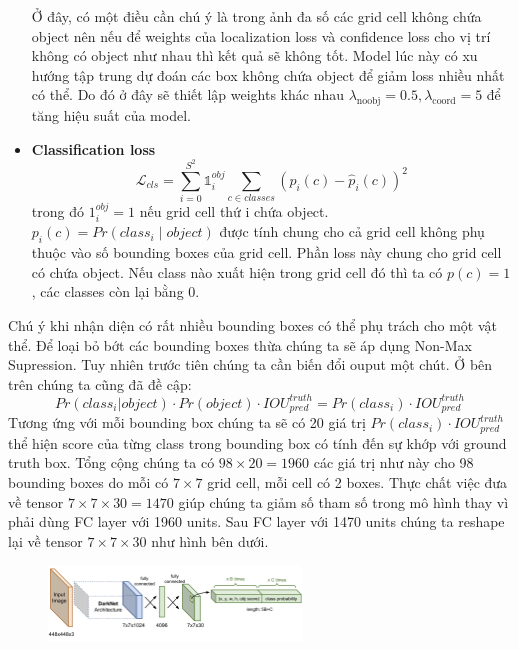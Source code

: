\begin{itemize}
Ở đây, có một điều cần chú ý là trong ảnh đa số các grid cell không chứa object nên nếu để weights của localization loss và confidence loss cho vị trí không có object như nhau thì kết quả sẽ không tốt. Model lúc này có xu hướng tập trung dự đoán các box không chứa object để giảm loss nhiều nhất có thể. Do đó ở đây sẽ thiết lập weights khác nhau $\lambda_\text{noobj} =0.5, \lambda_\text{coord} = 5$ để tăng hiệu suất của model.
    \item \textbf{Classification loss}
\begin{equation*}
    \mathcal{L}_{cls}={\sum_{i=0}^{S^2} \mathds{1}_i^{obj}  \sum_{c \in classes} (p_i(c) - \hat{p}_i(c))^2}
\end{equation*}
trong đó $1^{obj}_{i}=1$ nếu grid cell thứ i chứa object.\\

$p_i(c)=Pr(class_i \mid object)$ được tính chung cho cả grid cell không phụ thuộc vào số bounding boxes của grid cell. Phần loss này chung cho grid cell có chứa object. Nếu class nào xuất hiện trong grid cell đó thì ta có $p(c) = 1$, các classes còn lại bằng 0.
\end{itemize}

Chú ý khi nhận diện có rất nhiều bounding boxes có thể phụ trách cho một vật thể. Để loại bỏ bớt các bounding boxes thừa chúng ta sẽ áp dụng Non-Max Supression. Tuy nhiên trước tiên chúng ta cần biến đổi ouput một chút. Ở bên trên chúng ta cũng đã đề cập:
\[
Pr(class_i | object) \cdot Pr(object) \cdot IOU_{pred}^{truth} = Pr(class_i) \cdot IOU_{pred}^{truth}
\]
Tương ứng với mỗi bounding box chúng ta sẽ có 20 giá trị $Pr(class_i) \cdot IOU_{pred}^{truth}$ thể hiện score của từng class trong bounding box có tính đến sự khớp với ground truth box. Tổng cộng chúng ta có $98 \times 20 = 1960$  các giá trị như này cho 98 bounding boxes do mỗi có $7 \times 7$ grid cell, mỗi cell có 2 boxes. Thực chất việc đưa về tensor $7 \times 7 \times 30 = 1470$ giúp chúng ta giảm số tham số trong mô hình thay vì phải dùng FC layer với 1960 units. Sau FC layer với 1470 units chúng ta reshape lại về tensor $7 \times 7 \times 30$  như hình bên dưới.
\begin{figure}[htbp]
        \centering
        \includegraphics[width=0.6\textwidth]{images/2a-sign/1.png}
\end{figure}

